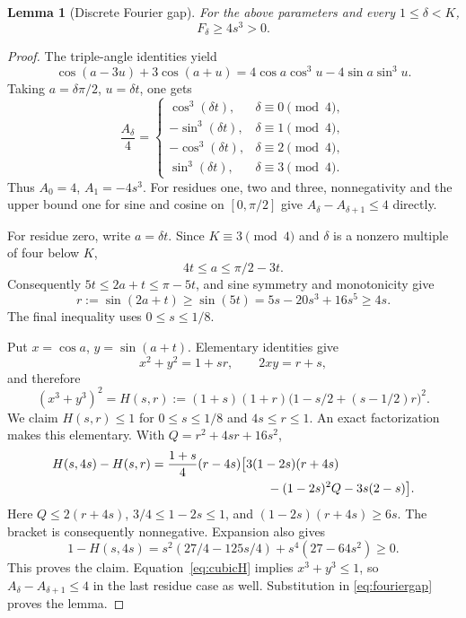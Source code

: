 \documentclass[11pt]{article}
\newtheorem{lemma}[theorem]{Lemma}
\theoremstyle{remark}\newtheorem{remark}[theorem]{Remark}
\begin{document}
\begin{lemma}[Discrete Fourier gap]\label{lem:gap}
For the above parameters and every $1\le\delta<K$,
\[
 F_\delta\ge4s^3>0.
\]
\end{lemma}
\begin{proof}
The triple-angle identities yield
\[
 \cos(a-3u)+3\cos(a+u)=4\cos a\cos^3u-4\sin a\sin^3u.
\]
Taking $a=\delta\pi/2$, $u=\delta t$, one gets
\[
 \frac{A_\delta}{4}=
 \begin{cases}
 \cos^3(\delta t),&\delta\equiv0\pmod4,\\
 -\sin^3(\delta t),&\delta\equiv1\pmod4,\\
 -\cos^3(\delta t),&\delta\equiv2\pmod4,\\
 \sin^3(\delta t),&\delta\equiv3\pmod4.
 \end{cases}
\]
Thus $A_0=4$, $A_1=-4s^3$. For residues one, two and three, nonnegativity and the upper bound one for sine and cosine on $[0,\pi/2]$ give $A_\delta-A_{\delta+1}\le4$ directly.

For residue zero, write $a=\delta t$. Since $K\equiv3\pmod4$ and $\delta$ is a nonzero multiple of four below $K$,
\[
 4t\le a\le\pi/2-3t.
\]
Consequently $5t\le2a+t\le\pi-5t$, and sine symmetry and monotonicity give
\[
 r:=\sin(2a+t)\ge\sin(5t)=5s-20s^3+16s^5\ge4s.
\]
The final inequality uses $0\le s\le1/8$.

Put $x=\cos a$, $y=\sin(a+t)$. Elementary identities give
\[
 x^2+y^2=1+sr,\qquad 2xy=r+s,
\]
and therefore
\begin{equation}\label{eq:cubicH}
 (x^3+y^3)^2=H(s,r):=(1+s)(1+r)
       \bigl(1-s/2+(s-1/2)r\bigr)^2.
\end{equation}
We claim $H(s,r)\le1$ for $0\le s\le1/8$ and $4s\le r\le1$. An exact factorization makes this elementary. With $Q=r^2+4sr+16s^2$,
\begin{align*}
 H(s,4s)-H(s,r)
  ={}&\frac{1+s}{4}(r-4s)\bigl[3(1-2s)(r+4s)\\
     &\hspace{28mm}-(1-2s)^2Q-3s(2-s)\bigr].
\end{align*}
Here $Q\le2(r+4s)$, $3/4\le1-2s\le1$, and
$(1-2s)(r+4s)\ge6s$. The bracket is consequently nonnegative. Expansion also gives
\[
 1-H(s,4s)
   =s^2(27/4-125s/4)+s^4(27-64s^2)\ge0.
\]
This proves the claim. Equation~\eqref{eq:cubicH} implies $x^3+y^3\le1$, so $A_\delta-A_{\delta+1}\le4$ in the last residue case as well. Substitution in \eqref{eq:fouriergap} proves the lemma.
\end{proof}
\end{document}
